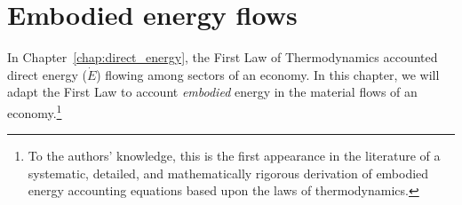 %
%
%

\chapter{Embodied energy flows}
\label{chap:embodied_energy}





In Chapter~\ref{chap:direct_energy}, the 
First Law of Thermodynamics
accounted direct energy ($\dot{E}$) flowing among sectors of an economy.
In this chapter, we will adapt the First Law to account  
\emph{embodied} energy
in the material flows of 
an economy.\footnote{To the authors' knowledge, 
this is the first appearance in the literature 
of a systematic, detailed, and mathematically rigorous derivation 
of embodied energy accounting equations based upon the 
laws of thermodynamics.}

